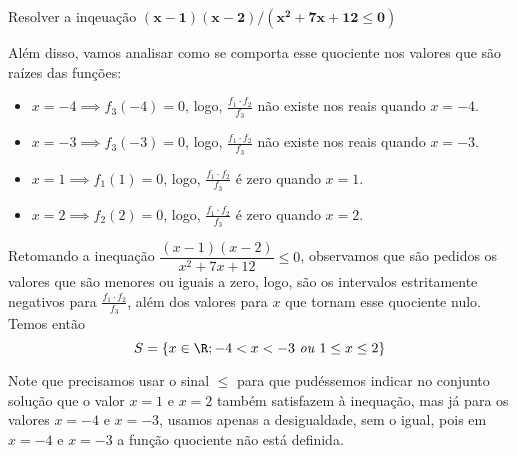 \begin{example}{Resolver a inqeuação $\bm{(x-1)(x-2)/(x^2+7x+12\leq0)}$}
\begin{multicols}{5}
\end{multicols}

Além disso, vamos analisar como se comporta esse quociente nos valores que são raízes das funções:
\begin{itemize}
\item $x=-4 \implies f_3(-4) = 0$, logo, $\frac{f_1\cdot f_2}{f_3}$ não existe nos reais quando $x=-4$.
\item $x=-3 \implies f_3(-3) = 0$, logo, $\frac{f_1\cdot f_2}{f_3}$ não existe nos reais quando $x=-3$.
\item $x=1 \implies f_1(1) = 0$, logo, $\frac{f_1\cdot f_2}{f_3}$ é zero quando $x=1$.
\item $x=2 \implies f_2(2) = 0$, logo, $\frac{f_1\cdot f_2}{f_3}$ é zero quando $x=2$.
\end{itemize}

Retomando a inequação $\dfrac{(x-1)(x-2)}{x^2+7x+12}\leq0$, observamos que são pedidos os valores que são menores ou iguais a zero, logo, são os intervalos estritamente negativos para $\frac{f_1\cdot f_2}{f_3}$, além dos valores para $x$ que tornam esse quociente nulo. Temos então 
\begin{equation*}
S=\{x\in\R;-4<x<-3\text{ \textit{ou} }1\leq x\leq2\}
\end{equation*}
\end{example}

\begin{observation}
Note que precisamos usar o sinal $\leq$ para que pudéssemos indicar no conjunto solução que o valor $x=1$ e $x=2$ também satisfazem à inequação, mas já para os valores $x=-4$ e $x=-3$, usamos apenas a desigualdade, sem o igual, pois em $x=-4$ e $x=-3$ a função quociente não está definida.
\end{observation}

